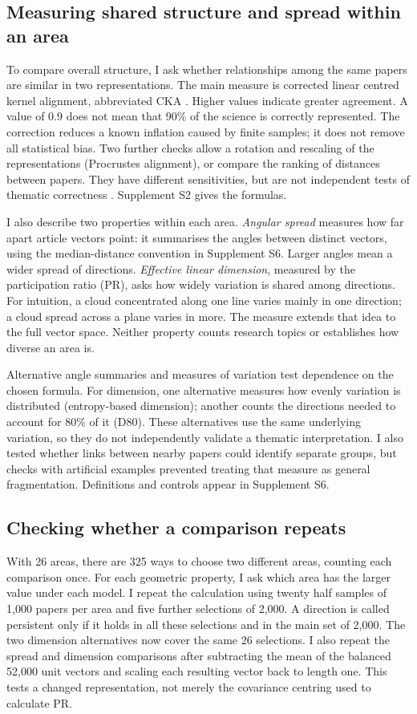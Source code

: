 \documentclass[12pt]{article}
\begin{document}
\subsection{Measuring shared structure and spread within an area}
To compare overall structure, I ask whether relationships among the same papers are similar in two representations. The main measure is corrected linear centred kernel alignment, abbreviated CKA \citep{pmlr-v97-kornblith19a,refa961d84a4e}. Higher values indicate greater agreement. A value of 0.9 does not mean that 90\% of the science is correctly represented. The correction reduces a known inflation caused by finite samples; it does not remove all statistical bias. Two further checks allow a rotation and rescaling of the representations (Procrustes alignment), or compare the ranking of distances between papers. They have different sensitivities, but are not independent tests of thematic correctness \citep{NEURIPS2021_252a3dba,pmlr-v285-williams24a}. Supplement S2 gives the formulas.

I also describe two properties within each area. \emph{Angular spread} measures how far apart article vectors point: it summarises the angles between distinct vectors, using the median-distance convention in Supplement S6. Larger angles mean a wider spread of directions. \emph{Effective linear dimension}, measured by the participation ratio (PR), asks how widely variation is shared among directions. For intuition, a cloud concentrated along one line varies mainly in one direction; a cloud spread across a plane varies in more. The measure extends that idea to the full vector space. Neither property counts research topics or establishes how diverse an area is.

Alternative angle summaries and measures of variation test dependence on the chosen formula. For dimension, one alternative measures how evenly variation is distributed (entropy-based dimension); another counts the directions needed to account for 80\% of it (D80). These alternatives use the same underlying variation, so they do not independently validate a thematic interpretation. I also tested whether links between nearby papers could identify separate groups, but checks with artificial examples prevented treating that measure as general fragmentation. Definitions and controls appear in Supplement S6.

\subsection{Checking whether a comparison repeats}
With 26 areas, there are 325 ways to choose two different areas, counting each comparison once. For each geometric property, I ask which area has the larger value under each model. I repeat the calculation using twenty half samples of 1,000 papers per area and five further selections of 2,000. A direction is called persistent only if it holds in all these selections and in the main set of 2,000. The two dimension alternatives now cover the same 26 selections. I also repeat the spread and dimension comparisons after subtracting the mean of the balanced 52,000 unit vectors and scaling each resulting vector back to length one. This tests a changed representation, not merely the covariance centring used to calculate PR.
\end{document}
